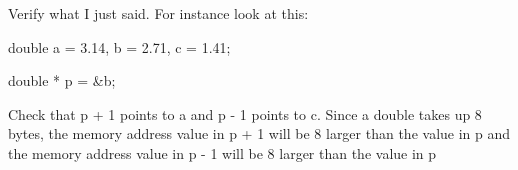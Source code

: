Verify what I just said. For instance look at this:



\begin{consolethree}[escapeinside=||]

double a = 3.14, b = 2.71, c = 1.41;

double * p = &b;

\end{consolethree}



Check that p + 1 points to a and p - 1 points to c. Since a double takes up 8 bytes, the memory address value in p + 1 will be 8 larger than the value in p and the memory address value in p - 1 will be 8 larger than the value in p

